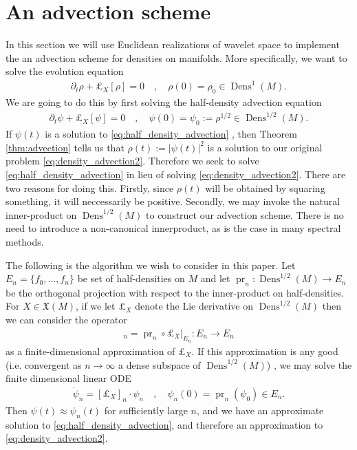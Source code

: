 \documentclass[letterpaper, 12 pt]{amsart}
\DeclareMathOperator{\Dens}{Dens}
\DeclareMathOperator{\pr}{pr}
\begin{document}


\section{An advection scheme}
\label{sec:scheme}
   In this section we will use Euclidean realizations of wavelet space
   to implement the an advection scheme for densities on manifolds.
   More specifically, we want to solve the evolution equation
   \begin{align}
     \partial_t \rho + \pounds_X[\rho] = 0 \quad , \quad 
     \rho(0) = \rho_0 \in \Dens^1(M). \label{eq:density_advection2}
   \end{align}
   We are going to do this by first solving the half-density advection
   equation
   \begin{align}
     \partial_t \psi + \pounds_X[\psi] = 0 \quad , \quad
     \psi(0) = \psi_0 := \rho^{1/2} \in \Dens^{1/2}(M). \label{eq:half_density_advection}
   \end{align}
   If $\psi(t)$ is a solution to \eqref{eq:half_density_advection}
   , then Theorem \ref{thm:advection} tells us that $\rho(t) := |\psi(t)|^2$
   is a solution to our original problem \eqref{eq:density_advection2}.
   Therefore we seek to solve \eqref{eq:half_density_advection}
   in lieu of solving \eqref{eq:density_advection2}.
   There are two reasons for doing this.
   Firstly, since $\rho(t)$ will be obtained by squaring something,
   it will neccessarily be positive.
   Secondly, we may invoke the natural inner-product on $\Dens^{1/2}(M)$
   to construct our advection scheme.
   There is no need to introduce a non-canonical innerproduct, as is
   the case in many spectral methods.
   
   The following is the algorithm we wish to consider in this paper.
   Let $E_n = \{ f_0, \dots, f_n \}$ be set of half-densities on $M$
   and let $\pr_n : \Dens^{1/2}(M) \to E_n$ be the orthogonal projection
   with respect to the inner-product on half-densities.
   For $X \in \mathfrak{X}(M)$, if we let $\pounds_X$ denote the Lie 
   derivative on $\Dens^{1/2}(M)$ then we can consider the operator
   \begin{align*}
     [\pounds_X]_n = \pr_n \circ \left. \pounds_X \right|_{E_n} : 
     E_n \to E_n
   \end{align*}
   as a finite-dimensional approximation of $\pounds_X$.
   If this approximation is any good
   (i.e. convergent as $n \to \infty$ a dense subspace of $\Dens^{1/2}(M)$)
   , we may solve the finite dimensional
   linear ODE
   \begin{align*}
     \dot{\psi}_n = [\pounds_X]_n \cdot \psi_n \quad , \quad
     \psi_n(0) = \pr_n( \psi_0 ) \in E_n.
   \end{align*}
   Then $\psi(t) \approx \psi_n(t)$ for sufficiently large $n$,
   and we have an approximate solution to \eqref{eq:half_density_advection},
   and therefore an approximation to \eqref{eq:density_advection2}.
\end{document}
